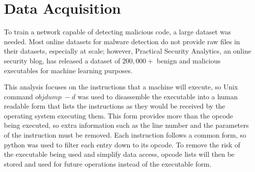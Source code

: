 
\section{Data Acquisition}

To train a network capable of detecting malicious code, a large dataset was needed. Most online datasets for malware
detection do not provide raw files in their datasets, especially at scale; however, Practical Security Analytics,
an online security blog, has released a dataset of $200,000+$ benign and malicious executables for machine learning
purposes\cite{lester}.

This analysis focuses on the instructions that a machine will execute, so Unix command $objdump\; -d$ was used to
disassemble the executable into a human readable form that lists the instructions as they would be received by the
operating system executing them. This form provides more than the opcode being executed, so extra information such
as the line number and the parameters of the instruction must be removed. Each instruction follows a common form,
so python was used to filter each entry down to its opcode. To remove the risk of the executable being used and
simplify data access, opcode lists will then be stored and used for future operations instead of the executable form.

